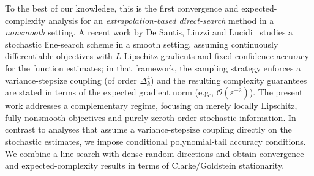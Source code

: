\documentclass[11pt,a4paper]{article}
\newcommand{\sara}[1]{{\color{red}{\textbf{[SS: #1]}}\color{black}}}
\begin{document}
To the best of our knowledge, this is the first convergence and expected-complexity analysis for an \emph{extrapolation-based direct-search} method in a  \emph{nonsmooth} setting.
A recent work by De Santis, Liuzzi and Lucidi~\cite{desantis2025linesearchbasedderivativefreemethodnoisy} studies a stochastic line-search scheme in a smooth setting, assuming continuously differentiable objectives with $L$-Lipschitz gradients and fixed-confidence accuracy for the function estimates; in that framework, the sampling strategy enforces a variance-stepsize coupling (of order $\Delta_k^4$) and the resulting complexity guarantees are stated in terms of the expected gradient norm (e.g., $\mathcal O(\varepsilon^{-2})$).
The present work addresses a complementary regime, focusing on merely locally Lipschitz, fully nonsmooth objectives and purely zeroth-order stochastic information. In contrast to analyses that assume a variance-stepsize coupling directly on the stochastic estimates, we impose conditional polynomial-tail accuracy conditions. %
 We combine a line search with dense random directions and obtain convergence and expected-complexity results in terms of Clarke/Goldstein stationarity. %
\end{document}
